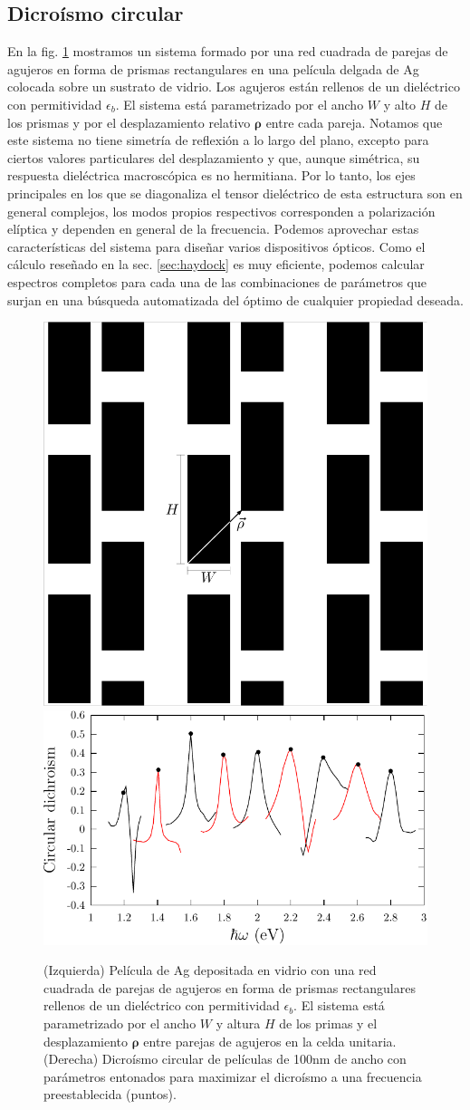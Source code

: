 \documentclass[12pt]{article}
\begin{document}
\subsection{Dicroísmo circular}
En la fig. \ref{fig:circular} mostramos un sistema formado por una red
cuadrada de parejas de agujeros en forma de prismas rectangulares en una película delgada
de Ag colocada sobre un sustrato de vidrio. Los agujeros están
rellenos de un dieléctrico con permitividad $\epsilon_b$. El sistema
está parametrizado por el ancho $W$ y alto $H$ de los prismas y por el
desplazamiento relativo $\bm \rho$ entre cada pareja. Notamos que
este sistema no tiene simetría de reflexión a lo largo del plano,
excepto para ciertos valores particulares del desplazamiento y que,
aunque simétrica, su respuesta dieléctrica macroscópica es no
hermitiana. Por lo tanto, los ejes principales en los que se
diagonaliza el tensor dieléctrico de esta estructura son en general
complejos, los modos propios respectivos corresponden a polarización elíptica y
dependen en general de la frecuencia. Podemos aprovechar estas
características del sistema para diseñar varios
dispositivos ópticos. Como el cálculo reseñado en la
sec. \ref{sec:haydock} es muy eficiente, podemos calcular espectros completos para
cada una de las combinaciones de parámetros que surjan en una búsqueda
automatizada del óptimo de cualquier propiedad deseada.
\cite{bms16}
\begin{figure}
  \centering
  \includegraphics[width=.3\textwidth]{fig16a}
  \includegraphics[width=.65\textwidth]{fig16b}
  \caption{(Izquierda) Película de Ag  depositada en vidrio con una
    red cuadrada de parejas de agujeros en forma de prismas
    rectangulares rellenos de un dieléctrico con permitividad
    $\epsilon_b$. El sistema está
    parametrizado por el ancho $W$ y altura $H$ de los primas  y el
    desplazamiento ${\bm \rho}$ entre parejas de agujeros en la celda
    unitaria. (Derecha) Dicroísmo circular de películas de 100nm de
    ancho con parámetros entonados para maximizar el dicroísmo a una
    frecuencia preestablecida (puntos).}
  \label{fig:circular}
\end{figure}
\end{document}
